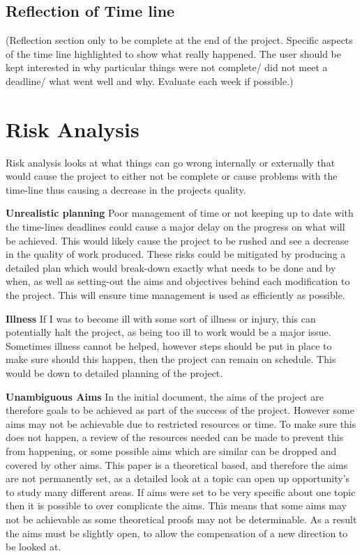 \documentclass[11pt,a4paper, notitlepage]{report}
\begin{document}
\subsection{Reflection of Time line}
\label{subsec:Reflection}
(Reflection section only to be complete at the end of the project. Specific aspects of the time line highlighted to show what really happened. The user should be kept interested in why particular things were not complete/ did not meet a deadline/ what went well and why. Evaluate each week if possible.)

\section{Risk Analysis}
\label{sec:RiskAnalysis}
Risk analysis looks at what things can go wrong internally or externally that would cause the project to either not be complete or cause problems with the time-line thus causing a decrease in the projects quality.


\textbf{Unrealistic planning}
Poor management of time or not keeping up to date with the time-lines deadlines could cause a major delay on the progress on what will be achieved. This would likely cause the project to be rushed and see a decrease in the quality of work produced. These risks could be mitigated by producing a detailed plan which would break-down exactly what needs to be done and by when, as well as setting-out the aims and objectives behind each modification to the project. This will ensure time management is used as efficiently as possible.

\textbf{Illness}
If I was to become ill with some sort of illness or injury, this can potentially halt the project, as being too ill to work would be a major issue. Sometimes illness cannot be helped, however steps should be put in place to make sure should this happen, then the project can remain on schedule. This would be down to detailed planning of the project.


\textbf{Unambiguous Aims}
In the initial document, the aims of the project are therefore goals to be achieved as part of the success of the project. However some aims may not be achievable due to restricted resources or time.
To make sure this does not happen, a review of the resources needed can be made to prevent this from happening, or some possible aims which are similar can be dropped and covered by other aims. This paper is a theoretical based, and therefore the aims are not permanently set, as a detailed look at a topic can open up opportunity's to study many different areas. If aims were set to be very specific about one topic then it is possible to over complicate the aims. This means that some aims may not be achievable as some theoretical proofs may not be determinable. As a result the aims must be slightly open, to allow the compensation of a new direction to be looked at.
\end{document}
